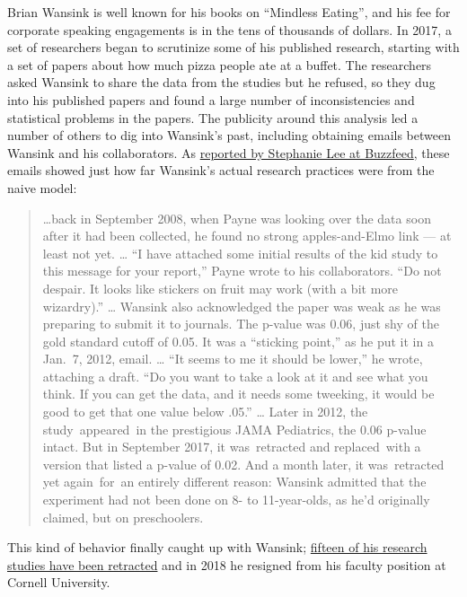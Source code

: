 \documentclass[12pt,]{book}
\theoremstyle{definition}
\theoremstyle{definition}
\theoremstyle{definition}
\theoremstyle{remark}
\begin{document}
Brian Wansink is well known for his books on ``Mindless Eating'', and his fee for corporate speaking engagements is in the tens of thousands of dollars. In 2017, a set of researchers began to scrutinize some of his published research, starting with a set of papers about how much pizza people ate at a buffet. The researchers asked Wansink to share the data from the studies but he refused, so they dug into his published papers and found a large number of inconsistencies and statistical problems in the papers. The publicity around this analysis led a number of others to dig into Wansink's past, including obtaining emails between Wansink and his collaborators. As \href{https://www.buzzfeednews.com/article/stephaniemlee/brian-wansink-cornell-p-hacking}{reported by Stephanie Lee at Buzzfeed}, these emails showed just how far Wansink's actual research practices were from the naive model:

\begin{quote}
\ldots{}back in September 2008, when Payne was looking over the data soon after it had been collected, he found no strong apples-and-Elmo link --- at least not yet. \ldots{}
``I have attached some initial results of the kid study to this message for your report,'' Payne wrote to his collaborators. ``Do not despair. It looks like stickers on fruit may work (with a bit more wizardry).'' \ldots{}
Wansink also acknowledged the paper was weak as he was preparing to submit it to journals. The p-value was 0.06, just shy of the gold standard cutoff of 0.05. It was a ``sticking point,'' as he put it in a Jan.~7, 2012, email. \ldots{}
``It seems to me it should be lower,'' he wrote, attaching a draft. ``Do you want to take a look at it and see what you think. If you can get the data, and it needs some tweeking, it would be good to get that one value below .05.'' \ldots{}
Later in 2012, the study~appeared~in the prestigious JAMA Pediatrics, the 0.06 p-value intact. But in September 2017, it was~retracted and replaced~with a version that listed a p-value of 0.02. And a month later, it was~retracted yet again~for~an entirely different reason: Wansink admitted that the experiment had not been done on 8- to 11-year-olds, as he'd originally claimed, but on preschoolers.
\end{quote}

This kind of behavior finally caught up with Wansink; \href{https://www.vox.com/science-and-health/2018/9/19/17879102/brian-wansink-cornell-food-brand-lab-retractions-jama}{fifteen of his research studies have been retracted} and in 2018 he resigned from his faculty position at Cornell University.
\end{document}
